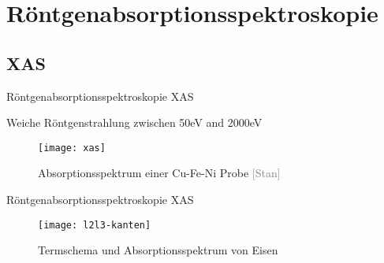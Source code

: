 \section{Röntgenabsorptionsspektroskopie}

\subsection{XAS}
\begin{frame}{Röntgenabsorptionsspektroskopie XAS}{}
	\begin{block}{}
		Weiche Röntgenstrahlung zwischen 50eV and 2000eV
	\end{block}

	\begin{figure}[H]
		\begin{center}
			\texttt{[image: xas]}
			\caption{Absorptionsspektrum einer Cu-Fe-Ni Probe \tiny{\textcolor{gray}{[Stan]}}}
		\end{center}
	\end{figure}
\end{frame}

\begin{frame}{Röntgenabsorptionsspektroskopie XAS}{}
	\begin{figure}[H]
		\begin{center}
			\texttt{[image: l2l3-kanten]}
			\caption{Termschema und Absorptionsspektrum von Eisen}
		\end{center}
	\end{figure}
\end{frame}

